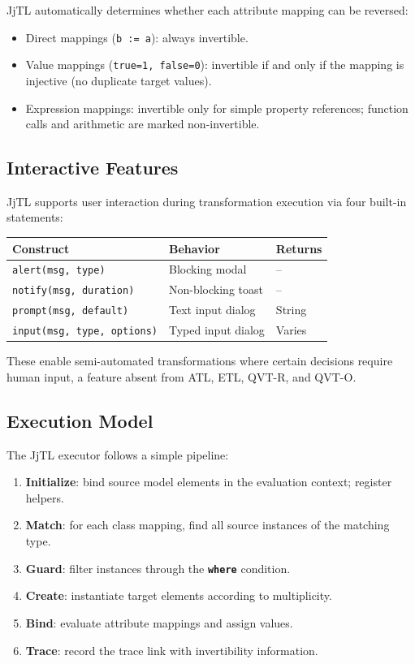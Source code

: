 \documentclass[11pt,a4paper]{article}
\newcommand{\jjtl}{\textsf{JjTL}}
\newcommand{\kw}[1]{\texttt{\textbf{#1}}}
\begin{document}
\jjtl{} automatically determines whether each attribute mapping can be reversed:
\begin{itemize}
    \item Direct mappings (\texttt{b := a}): always invertible.
    \item Value mappings (\texttt{true=1, false=0}): invertible if and only if the mapping is injective (no duplicate target values).
    \item Expression mappings: invertible only for simple property references; function calls and arithmetic are marked non-invertible.
\end{itemize}


\subsection{Interactive Features}

\jjtl{} supports user interaction during transformation execution via four built-in statements:

\begin{center}
\begin{tabular}{@{}lll@{}}
\toprule
\textbf{Construct} & \textbf{Behavior} & \textbf{Returns} \\
\midrule
\texttt{alert(msg, type)} & Blocking modal & -- \\
\texttt{notify(msg, duration)} & Non-blocking toast & -- \\
\texttt{prompt(msg, default)} & Text input dialog & String \\
\texttt{input(msg, type, options)} & Typed input dialog & Varies \\
\bottomrule
\end{tabular}
\end{center}

These enable semi-automated transformations where certain decisions require human input, a feature absent from ATL, ETL, QVT-R, and QVT-O.


\subsection{Execution Model}

The \jjtl{} executor follows a simple pipeline:

\begin{enumerate}
    \item \textbf{Initialize}: bind source model elements in the evaluation context; register helpers.
    \item \textbf{Match}: for each class mapping, find all source instances of the matching type.
    \item \textbf{Guard}: filter instances through the \kw{where} condition.
    \item \textbf{Create}: instantiate target elements according to multiplicity.
    \item \textbf{Bind}: evaluate attribute mappings and assign values.
    \item \textbf{Trace}: record the trace link with invertibility information.
\end{enumerate}
\end{document}
